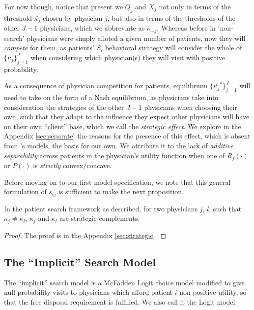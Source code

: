 \documentclass[../main.tex]{subfiles}
\begin{document}
For now though, notice that present we $Q_j$ and $X_j$  not only in terms of the threshold $\bar{\kappa_j}$ chosen by physician $j$, but also in terms of the thresholds of the other $J - 1$ physicians, which we abbreviate as $\bar{\kappa}_{-j}$. Whereas before in `non-search' physicians were simply alloted a given number of patients, now they will \textit{compete} for them, as patients' $S_i$ behavioral strategy will consider the whole of $\{\bar{\kappa_j}\}_{j =1}^{J}$ when considering which physician(s) they will visit with positive probability.

As a consequence of physician competition for patients, equilibrium $\{\bar{\kappa_j}^*\}_{j =1}^{J}$ will need to take on the form of a Nash equilibrium, as physicians take into consideration the strategies of the other $J - 1$ physicians when choosing their own, such that they adapt to the influence they expect other physicians will have on their own ``client'' base, which we call the \textit{strategic effect}. We explore in the Appendix \ref{sec:separate} the reasons for the presence of this effect, which is absent from \citeauthor{schnell2017physician}'s models, the basis for our own. We attribute it to the lack of \textit{additive separability} across patients in the physician's utility function when one of $R_j(\cdot)$ or $P(\cdot)$ is \textit{strictly} convex/concave.

Before moving on to our first model specification, we note that this general formulation of $s_{ij}$ is sufficient to make the next proposition.

\begin{prop}
    \label{complements}
In the patient search framework as described, for two physicians $j$, $l$, such that $\bar{\kappa_j} \neq \bar{\kappa_l}$, $\bar{\kappa_j}$ and $\bar{\kappa_l}$ are strategic complements.
\end{prop}

\begin{proof}
    The proof is in the Appendix \ref{sec:strategic}.
\end{proof}







\subsection{The ``Implicit'' Search Model}

The ``implicit'' search model is a McFadden Logit choice model modified to give null probability visits to physicians which afford patient $i$ non-positive utility, so that the free disposal requirement is fulfilled. We also call it the Logit model.
\end{document}
